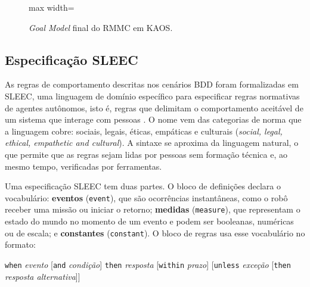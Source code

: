 \documentclass[a4paper, 12pt]{article}
\begin{document}
\begin{landscape}
\begin{figure}[htbp]
\begin{adjustbox}{max width=\linewidth}
    \end{adjustbox}
    \caption{\textit{Goal Model} final do RMMC em KAOS.}
    \label{fig:gmfinal}
  \end{figure}
\end{landscape}

\subsection{Especificação SLEEC}

As regras de comportamento descritas nos cenários BDD foram formalizadas em SLEEC, uma linguagem de domínio específico para especificar regras normativas de agentes autônomos, isto é, regras que delimitam o comportamento aceitável de um sistema que interage com pessoas \cite{getiryaman2024}. O nome vem das categorias de norma que a linguagem cobre: sociais, legais, éticas, empáticas e culturais (\textit{social, legal, ethical, empathetic and cultural}). A sintaxe se aproxima da linguagem natural, o que permite que as regras sejam lidas por pessoas sem formação técnica e, ao mesmo tempo, verificadas por ferramentas.

Uma especificação SLEEC tem duas partes. O bloco de definições declara o vocabulário: \textbf{eventos} (\texttt{event}), que são ocorrências instantâneas, como o robô receber uma missão ou iniciar o retorno; \textbf{medidas} (\texttt{measure}), que representam o estado do mundo no momento de um evento e podem ser booleanas, numéricas ou de escala; e \textbf{constantes} (\texttt{constant}). O bloco de regras usa esse vocabulário no formato:

\begin{center}
  \texttt{when} \textit{evento} [\texttt{and} \textit{condição}] \texttt{then} \textit{resposta} [\texttt{within} \textit{prazo}] [\texttt{unless} \textit{exceção} [\texttt{then} \textit{resposta alternativa}]]
\end{center}
\end{document}
